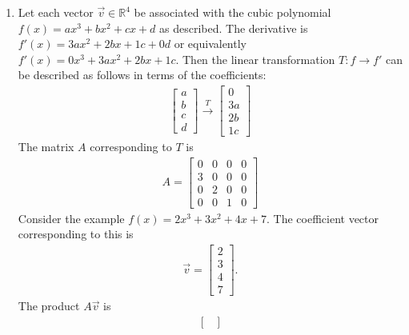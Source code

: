 \documentclass[10pt,letterpaper,final]{report}
\begin{document}
\begin{enumerate}[label=(\alph*)]
  \item Let each vector $\vec{v} \in \mathbb{R}^4$ be associated with the cubic polynomial $f(x) = ax^3 + bx^2 + cx + d$ as described. The derivative is $f'(x) = 3ax^2 + 2bx + 1c + 0d$ or equivalently $f'(x) = 0x^3 + 3ax^2 + 2bx + 1c$. Then the linear transformation $T: f \to f'$ can be described as follows in terms of the coefficients:
        \begin{align*}
          \begin{bmatrix}
            a \\
            b \\
            c \\
            d
          \end{bmatrix} \xrightarrow{T} \begin{bmatrix}
                                          0  \\
                                          3a \\
                                          2b \\
                                          1c
                                        \end{bmatrix}
        \end{align*}
        The matrix $A$ corresponding to $T$ is
        \begin{align*}
          A = \begin{bmatrix}
                0 & 0 & 0 & 0 \\
                3 & 0 & 0 & 0 \\
                0 & 2 & 0 & 0 \\
                0 & 0 & 1 & 0
              \end{bmatrix}
        \end{align*}
        Consider the example $f(x) = 2x^3 + 3x^2 + 4x + 7$. The coefficient vector corresponding to this is
        \begin{align*}
          \vec{v} = \begin{bmatrix}
                      2 \\
                      3 \\
                      4 \\
                      7
                    \end{bmatrix}.
        \end{align*}
        The product $A\vec{v}$ is
        \begin{align*}
          \begin{bmatrix}

\end{bmatrix}
\end{align*}
\end{enumerate}
\end{document}
